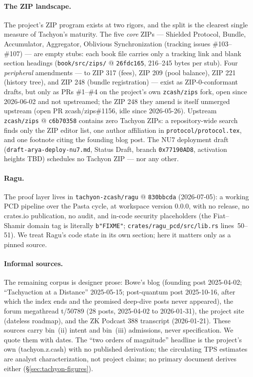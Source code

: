 \documentclass[11pt,a4paper]{article}
\theoremstyle{definition}
\begin{document}
\paragraph{The ZIP landscape.} The project's ZIP program exists at two rigors,
and the split is the clearest single measure of Tachyon's maturity. The five
\emph{core} ZIPs --- Shielded Protocol, Bundle, Accumulator, Aggregator,
Oblivious Synchronization (tracking issues \#103--\#107) --- are empty stubs:
each book file carries only a tracking link and blank section headings
(\texttt{book/src/zips/} @ \texttt{26fdc165}, 216--245 bytes per stub). Four
\emph{peripheral} amendments --- to ZIP 317 (fees), ZIP 209 (pool balance),
ZIP 221 (history tree), and ZIP 248 (bundle registration) --- exist as
ZIP-0-conformant drafts, but only as PRs \#1--\#4 on the project's own
\texttt{zcash/zips} fork, open since 2026-06-02 and not upstreamed; the ZIP
248 they amend is itself unmerged upstream (open PR zcash/zips\#1156, idle
since 2026-05-26). Upstream \texttt{zcash/zips} @ \texttt{c6b70358} contains
zero Tachyon ZIPs: a repository-wide search finds only the ZIP editor list,
one author affiliation in \texttt{protocol/protocol.tex}, and one footnote
citing the founding blog post. The NU7 deployment draft
(\texttt{draft-arya-deploy-nu7.md}, Status Draft, branch \texttt{0x77190AD8},
activation heights TBD) schedules no Tachyon ZIP --- nor any other.

\paragraph{Ragu.} The proof layer lives in \texttt{tachyon-zcash/ragu}
@ \texttt{830bbcda} (2026-07-05): a working PCD pipeline over the Pasta cycle,
at workspace version 0.0.0, with no release, no crates.io publication, no
audit, and in-code security placeholders (the Fiat--Shamir domain tag is
literally \texttt{b"FIXME"}; \texttt{crates/ragu\_pcd/src/lib.rs}
lines~50--51).
We treat Ragu's code state in its own section; here it matters only as a
pinned source.

\paragraph{Informal sources.} The remaining corpus is designer prose: Bowe's
blog (founding post 2025-04-02; ``Tachyaction at a Distance'' 2025-05-15;
post-quantum post 2025-10-16, after which the index ends and the promised
deep-dive posts never appeared), the forum megathread t/50789 (28 posts,
2025-04-02 to 2026-01-31), the project site (dateless roadmap), and the ZK
Podcast 388 transcript (2026-01-21). These sources carry bin~(ii) intent and
bin~(iii) admissions, never specification. We quote them with dates. The
``two orders of magnitude'' headline is the project's own (tachyon.z.cash)
with no published derivation; the circulating TPS estimates are analyst
characterization, not project claims; no primary document derives either
(\S\ref{sec:tachyon-figures}).
\end{document}
